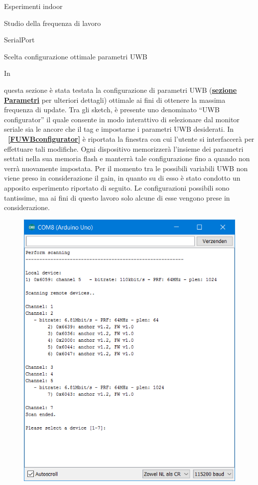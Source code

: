 \documentclass[12pt]{report}
\begin{document}
\begin{section}{Esperimenti indoor}
\begin{subsection}{Studio della frequenza di lavoro}
\begin{subsubsection}{SerialPort}
		\end{subsubsection}
		\newpage

		\begin{subsubsection}{Scelta configurazione ottimale parametri UWB}

			\hypertarget{SS1}{In} questa sezione è stata testata la configurazione di parametri UWB (\hyperlink{S3}{\textbf{sezione Parametri}} per ulteriori dettagli) ottimale ai fini di ottenere la massima frequenza di update. Tra gli sketch, è presente uno denominato “UWB configurator” il quale consente in modo 						interattivo di selezionare dal monitor seriale sia le ancore che il tag e impostarne i parametri UWB desiderati. In \textbf{\figurename~\ref{FUWBconfigurator}} è riportata la finestra con cui l'utente si interfaccerà per effettuare tali modifiche. Ogni dispositivo memorizzerà l’insieme dei parametri settati nella sua 					memoria flash e manterrà tale configurazione fino a quando non verrà nuovamente impostata. Per il momento tra le possibili variabili UWB non viene preso in considerazione il gain, in quanto su di esso è stato condotto un apposito esperimento riportato di seguito. Le configurazioni possibili sono tantissime, ma 			ai fini di questo lavoro solo alcune di esse vengono prese in considerazione.\\
			\begin{figure}[H]
				\centering
				\includegraphics[scale=0.6]{FUWBconfigurator}

\end{figure}
\end{subsubsection}
\end{subsection}
\end{section}
\end{document}
